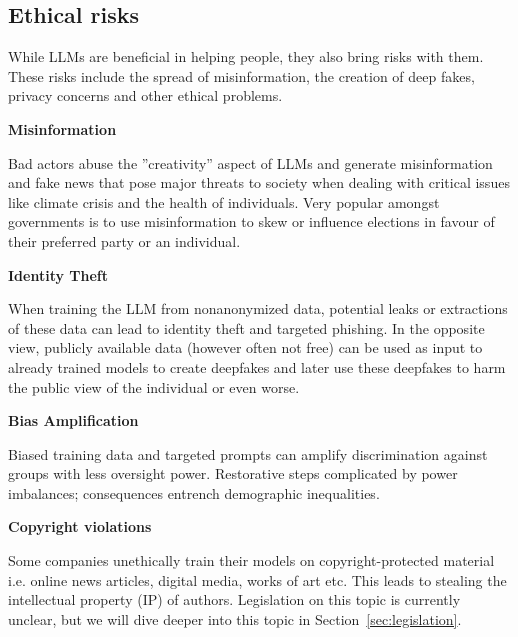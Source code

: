 \subsection{Ethical risks}
While LLMs are beneficial in helping people, they also bring risks with them. These risks include the spread of misinformation, the creation of deep fakes, privacy concerns and other ethical problems. 


\textbf{Misinformation}

Bad actors abuse the ''creativity'' aspect of LLMs and generate misinformation and fake news that pose major threats to society when dealing with critical issues like climate crisis and the health of individuals. Very popular amongst governments is to use misinformation to skew or influence elections in favour of their preferred party or an individual.

\textbf{Identity Theft}

When training the LLM from nonanonymized data, potential leaks or extractions of these data can lead to identity theft and targeted phishing. 
In the opposite view, publicly available data (however often not free) can be used as input to already trained models to create deepfakes and later use these deepfakes to harm the public view of the individual or even worse.

\textbf{Bias Amplification}

Biased training data and targeted prompts can amplify discrimination against groups with less oversight power. 
Restorative steps complicated by power imbalances; consequences entrench demographic inequalities\cite{kumar2024ethicsinteractionmitigatingsecurity}. 


\textbf{Copyright violations}

Some companies unethically train their models on copyright-protected material i.e. online news articles, digital media, works of art etc. This leads to stealing the intellectual property (IP) of authors. Legislation on this topic is currently unclear, but we will dive deeper into this topic in Section~\ref{sec:legislation}.

